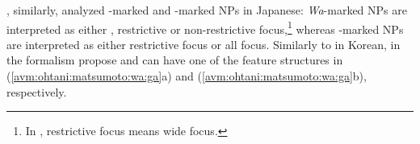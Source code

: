 \noindent \citet{ohtani:matsumoto:04}, similarly, analyzed \wa-marked
and \ga-marked NPs in Japanese: \textit{Wa}-marked NPs are interpreted
as either , restrictive  or non-restrictive
focus,\footnote{In \citet[p.\ 95]{ohtani:matsumoto:04}, restrictive
  focus means wide focus.}  whereas \ga-marked NPs are interpreted as
either restrictive focus or all focus.  Similarly to
 in Korean, in the formalism
\citeauthor{ohtani:matsumoto:04} propose \wa and \ga can have one of
the feature structures in (\ref{avm:ohtani:matsumoto:wa:ga}a) and
(\ref{avm:ohtani:matsumoto:wa:ga}b), respectively.

